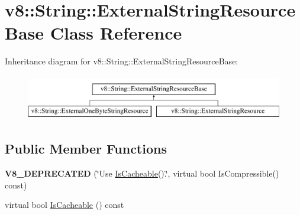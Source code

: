 \hypertarget{classv8_1_1String_1_1ExternalStringResourceBase}{}\section{v8\+:\+:String\+:\+:External\+String\+Resource\+Base Class Reference}
\label{classv8_1_1String_1_1ExternalStringResourceBase}
Inheritance diagram for v8\+:\+:String\+:\+:External\+String\+Resource\+Base\+:\begin{figure}[H]
\begin{center}
\leavevmode
\includegraphics[height=2.000000cm]{classv8_1_1String_1_1ExternalStringResourceBase}
\end{center}
\end{figure}
\subsection*{Public Member Functions}
\begin{DoxyCompactItemize}
\item 
\mbox{\label{classv8_1_1String_1_1ExternalStringResourceBase_a07d6b2291158845591c0458365582c31}} 
{\bfseries V8\+\_\+\+D\+E\+P\+R\+E\+C\+A\+T\+ED} (\char`\"{}Use \mbox{\hyperlink{classv8_1_1String_1_1ExternalStringResourceBase_a994c7580185c831abd45075d297dd07c}{Is\+Cacheable}}().\char`\"{}, virtual bool Is\+Compressible() const)
\item 
virtual bool \mbox{\hyperlink{classv8_1_1String_1_1ExternalStringResourceBase_a994c7580185c831abd45075d297dd07c}{Is\+Cacheable}} () const
\end{DoxyCompactItemize}
